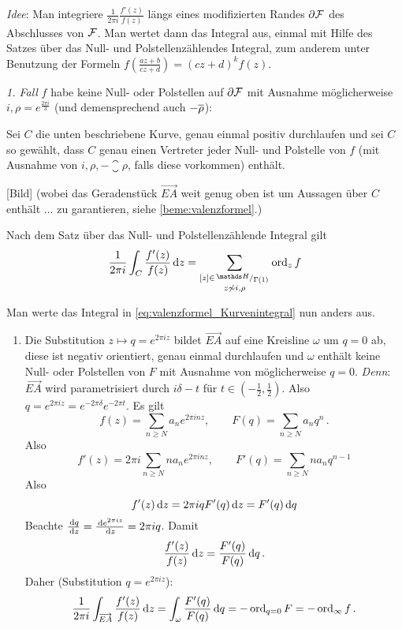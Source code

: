\begin{bewe}
	\emph{Idee}: Man integriere $\frac{1}{2\pi i} \frac{f'(z)}{f(z)}$ längs eines modifizierten Randes $\partial \mathcal{F}$ des Abschlusses von $\mathcal{F}$.
	Man wertet dann das Integral aus, einmal mit Hilfe des Satzes über das Null- und Polstellenzählendes Integral, zum anderem unter Benutzung der Formeln $f(\frac{az+b}{cz+d}) = (cz+d)^k f(z)$.
	
	\emph{1. Fall} $f$ habe keine Null- oder Polstellen auf $\partial \mathcal{F}$ mit Ausnahme möglicherweise $i, \rho = e^{\frac{2\pi i}{3}}$ (und demensprechend auch $-\overline{\rho}$):
	
	Sei $C$ die unten beschriebene Kurve, genau einmal positiv durchlaufen und sei $C$ so gewählt, dass $C$ genau einen Vertreter jeder Null- und Polstelle von $f$ (mit Ausnahme von $i, \rho, -\closure\rho$, falls diese vorkommen) enthält.
	
	[Bild] (wobei das Geradenstück $\overrightarrow{EA}$ weit genug oben ist um Aussagen über \glqq$C$ enthält ...\grqq{} zu garantieren, siehe \autoref{beme:valenzformel}.)
	
	Nach dem Satz über das Null- und Polstellenzählende Integral gilt
	\begin{equation}\label{eq:valenzformel_Kurvenintegral}
	\frac{1}{2\pi i} \int_C \frac{f'(z)}{f(z)} \opd z = \sum_{\substack{[z] \in \modulo{\HH}{\Gamma(1)} \\ z \not\sim i, \rho}} \ord_z f
	\end{equation}
	
	Man werte das Integral in \eqref{eq:valenzformel_Kurvenintegral} nun anders aus.
	
	\begin{enumerate}
		\item Die Substitution $z \mapsto q = e^{2\pi iz}$ bildet $\overrightarrow{EA}$ auf eine Kreisline $\omega$ um $q=0$ ab, diese ist negativ orientiert, genau einmal durchlaufen und $\omega$ enthält keine Null- oder Polstellen von $F$ mit Ausnahme von möglicherweise $q=0$.
		\emph{Denn}: $\overrightarrow{EA}$ wird parametrisiert durch $i\delta - t$ für $t \in (-\frac{1}{2}, \frac{1}{2})$.
		Also $q = e^{2\pi iz} = e^{-2\pi\delta} e^{-2\pi t}$.
		Es gilt
		\[
		f(z) = \sum_{n \geq N} a_n e^{2\pi inz},
		\qquad F(q) = \sum_{n \geq N} a_n q^n
		\,.
		\]
		Also
		\[
		f'(z) = 2\pi i \sum_{n\geq N} na_n e^{2\pi inz},
		\qquad F'(q) = \sum_{n \geq N} n a_nq^{n-1}
		\]
		Also
		\[
		f'(z) \,\mathrm{d} z = 2\pi iq F'(q) \,\mathrm{d} z = F'(q) \,\mathrm{d} q
		\]
		Beachte $\derive[q] = \derive[e^{2\pi iz}] = 2\pi i q$.
		Damit
		\[
		\frac{f'(z)}{f(z)} \,\mathrm{d} z = \frac{F'(q)}{F(q)} \,\mathrm{d} q
		\,.
		\]
		Daher (Substitution $q = e^{2\pi iz}$):
		\[
		\frac{1}{2\pi i} \int_{\overrightarrow{EA}} \frac{f'(z)}{f(z)} \,\mathrm{d} z
		= \int_\omega \frac{F'(q)}{F(q)} \,\mathrm{d} q = - \operatorname{ord}_{q=0} F = - \operatorname{ord}_\infty f\,.
		\]
		

\end{enumerate}
\end{bewe}
